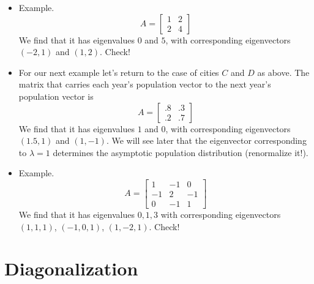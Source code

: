 \documentclass[11pt,oneside]{amsbook}
\theoremstyle{definition}
\theoremstyle{plain}
\theoremstyle{definition}
\theoremstyle{remark}
\numberwithin{equation}{section}
\numberwithin{figure}{section}
\begin{document}
\begin{itemize}
  \begin{itemize}
  \item Step 0. Reconsider the eigenvalue/eigenvector equation as $A\mathbf{x}-\lambda\mathbf{x}=0$ or $(A-\lambda I)\mathbf{x}=\mathbf{0}$
  \item Step 1. By the above rewriting, we wish to find out when $A-\lambda I$ has a nontrivial null space. We know this happens when $A-\lambda I$ is singular, so set $\det(A-\lambda I)=0$ and solve for $\lambda$.
  \item Step 2. For each solution $\lambda$ obtained in step $1$, plug it into $A-\lambda I$ and calculate the null space basis. This is the corresponding eigenvector $\mathbf{x}$. (Actually there may be several corresponding eigenvectors.)
  \end{itemize}
\item Example.
  \[A=\begin{bmatrix}1&2\\2&4\end{bmatrix}
  \]
  We find that it has eigenvalues $0$ and $5$, with corresponding eigenvectors $(-2,1)$ and $(1,2)$. Check!
\item For our next example let's return to the case of cities $C$ and $D$ as above. The matrix that carries each year's population vector to the next year's population vector is
  \[A=\begin{bmatrix}.8&.3\\.2&.7\end{bmatrix}
  \]
  We find that it has eigenvalues $1$ and $0$, with corresponding eigenvectors $(1.5,1)$ and $(1,-1)$. We will see later that the eigenvector corresponding to $\lambda=1$ determines the asymptotic population distribution (renormalize it!).
\item Example.
  \[A=\begin{bmatrix}1&-1&0\\-1&2&-1\\0&-1&1\end{bmatrix}
  \]
  We find that it has eigenvalues $0,1,3$ with corresponding eigenvectors $(1,1,1)$, $(-1,0,1)$, $(1,-2,1)$. Check!
\end{itemize}

\newpage
\section{Diagonalization}
\end{document}
